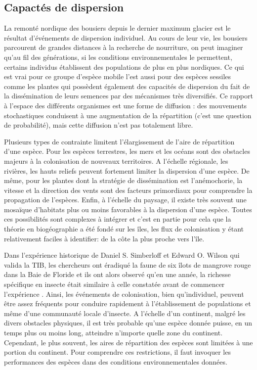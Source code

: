 \subsection*{Capactés de dispersion}\label{capactuxe9s-de-dispersion}

La remonté nordique des bousiers depuis le dernier maximum glacier est
le résultat d'événements de dispersion individuel. Au cours de leur vie,
les bousiers parcourent de grandes distances à la recherche de
nourriture, on peut imaginer qu'au fil des générations, si les
conditions environnementales le permettent, certains individus
établissent des populations de plus en plus nordiques. Ce qui est vrai
pour ce groupe d'espèce mobile l'est aussi pour des espèces sessiles
comme les plantes qui possèdent également des capacités de dispersion du
fait de la dissémination de leurs semences par des mécanismes très
diversifiés. Ce rapport à l'espace des différents organismes est une
forme de diffusion : des mouvements stochastiques conduisent à une
augmentation de la répartition (c'est une question de probabilité), mais
cette diffusion n'est pas totalement libre.

Plusieurs types de contrainte limitent l'élargissement de l'aire de
répartition d'une espèce. Pour les espèces terrestres, les mers et les
océans sont des obstacles majeurs à la colonisation de nouveaux
territoires. A l'échelle régionale, les rivières, les hauts reliefs
peuvent fortement limiter la dispersion d'une espèce. De même, pour les
plantes dont la stratégie de dissémination est l'anémochorie, la vitesse
et la direction des vents sont des facteurs primordiaux pour comprendre
la propagation de l'espèces. Enfin, à l'échelle du paysage, il existe
très souvent une mosaïque d'habitats plus ou moins favorables à la
dispersion d'une espèce. Toutes ces possibilités sont complexes à
intégrer et c'est en partie pour cela que la théorie en biogéographie a
été fondé sur les îles, les flux de colonisation y étant relativement
faciles à identifier: de la côte la plus proche vers l'île.

Dans l'expérience historique de Daniel S. Simberloff et Edward O. Wilson
qui valida la TIB, les chercheurs ont éradiqué la faune de six îlots de
mangrove rouge dans la Baie de Floride et ils ont alors observé qu'en
une année, la richesse spécifique en insecte était similaire à celle
constatée avant de commencer l'expérience \citep{Simberloff1969}. Ainsi,
les événements de colonisation, bien qu'individuel, peuvent être assez
fréquents pour conduire rapidement à l'établissement de populations et
même d'une communauté locale d'insecte. A l'échelle d'un continent,
malgré les divers obstacles physiques, il est très probable qu'une
espèce donnée puisse, en un temps plus ou moins long, atteindre
n'importe quelle zone du continent. Cependant, le plus souvent, les
aires de répartition des espèces sont limitées à une portion du
continent. Pour comprendre ces restrictions, il faut invoquer les
performances des espèces dans des conditions environnementales données.

